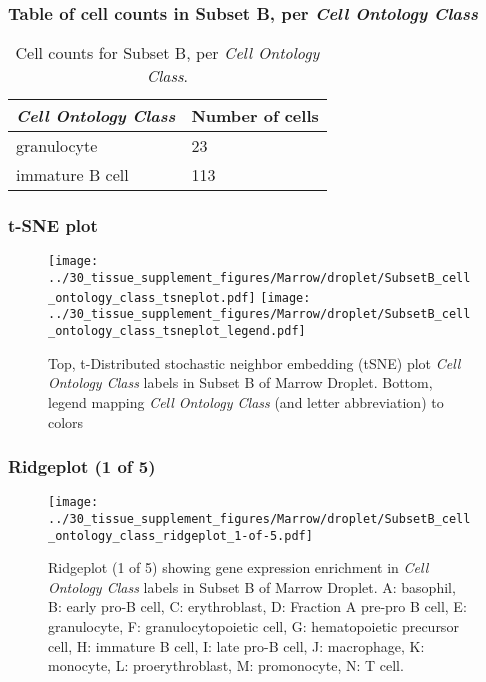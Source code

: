 \subsubsection{Table of cell counts in Subset B, per \emph{Cell Ontology Class}}\begin{table}[h]
\centering
\label{my-label}
\begin{tabular}{@{}ll@{}}
\toprule

\emph{Cell Ontology Class}& Number of cells \\ \midrule
granulocyte & 23 \\

immature B cell & 113 \\
\bottomrule
\end{tabular}
\caption{Cell counts for Subset B, per \emph{Cell Ontology Class}.}
\end{table}

\clearpage
\subsubsection{t-SNE plot}
\begin{figure}[h]
\centering
\texttt{[image: ../30\_tissue\_supplement\_figures/Marrow/droplet/SubsetB\_cell\_ontology\_class\_tsneplot.pdf]}
\texttt{[image: ../30\_tissue\_supplement\_figures/Marrow/droplet/SubsetB\_cell\_ontology\_class\_tsneplot\_legend.pdf]}
\caption{Top, t-Distributed stochastic neighbor embedding (tSNE) plot  \emph{Cell Ontology Class} labels in Subset B of Marrow Droplet. Bottom, legend mapping \emph{Cell Ontology Class} (and letter abbreviation) to colors}
\end{figure}


\clearpage

\subsubsection{Ridgeplot (1 of 5)}
\begin{figure}[h]
\centering
\texttt{[image: ../30\_tissue\_supplement\_figures/Marrow/droplet/SubsetB\_cell\_ontology\_class\_ridgeplot\_1-of-5.pdf]}

\caption{ Ridgeplot (1 of 5)  showing gene expression enrichment in \emph{Cell Ontology Class} labels in Subset B of Marrow Droplet. A: basophil, B: early pro-B cell, C: erythroblast, D: Fraction A pre-pro B cell, E: granulocyte, F: granulocytopoietic cell, G: hematopoietic precursor cell, H: immature B cell, I: late pro-B cell, J: macrophage, K: monocyte, L: proerythroblast, M: promonocyte, N: T cell.}
\end{figure}


